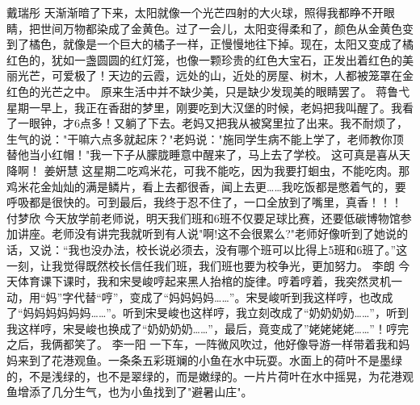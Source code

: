 {}\markdownRendererInterblockSeparator
{}戴瑞彤\markdownRendererInterblockSeparator
{}天渐渐暗了下来，太阳就像一个光芒四射的大火球，照得我都睁不开眼睛，把世间万物都染成了金黄色。过了一会儿，太阳变得柔和了，颜色从金黄色变到了橘色，就像是一个巨大的橘子一样，正慢慢地往下掉。现在，太阳又变成了橘红色的，犹如一盏圆圆的红灯笼，也像一颗珍贵的红色大宝石，正发出着红色的美丽光芒，可爱极了！天边的云霞，远处的山，近处的房屋、树木，人都被笼罩在金红色的光芒之中。\markdownRendererInterblockSeparator
{}原来生活中并不缺少美，只是缺少发现美的眼睛罢了。\markdownRendererInterblockSeparator
{}\markdownRendererInterblockSeparator
{}蒋鲁弋\markdownRendererInterblockSeparator
{}星期一早上，我正在香甜的梦里，刚要吃到大汉堡的时候，老妈把我叫醒了。我看了一眼钟，才6点多！又躺了下去。老妈又把我从被窝里拉了出来。我不耐烦了，生气的说："干嘛六点多就起床？"老妈说："施同学生病不能上学了，老师教你顶替他当小红帽！"我一下子从朦胧睡意中醒来了，马上去了学校。\markdownRendererInterblockSeparator
{}这可真是喜从天降啊！\markdownRendererInterblockSeparator
{}\markdownRendererInterblockSeparator
{}姜姸慧\markdownRendererInterblockSeparator
{}这星期二吃鸡米花，可我不能吃，因为我要打蛔虫，不能吃肉。那鸡米花金灿灿的满是鳞片，看上去都很香，闻上去更……我吃饭都是憋着气的，要呼吸都是很快的。可到最后，我终于忍不住了，一口全放到了嘴里，真香！！！\markdownRendererInterblockSeparator
{}\markdownRendererInterblockSeparator
{}付梦欣\markdownRendererInterblockSeparator
{}今天放学前老师说，明天我们班和6班不仅要足球比赛，还要低碳博物馆参加讲座。老师没有讲完我就听到有人说"啊!这不会很累么?"老师好像听到了她说的话，又说：“我也没办法，校长说必须去，没有哪个班可以比得上5班和6班了。”这一刻，让我觉得既然校长信任我们班，我们班也要为校争光，更加努力。\markdownRendererInterblockSeparator
{}\markdownRendererInterblockSeparator
{}李朗\markdownRendererInterblockSeparator
{}今天体育课下课时，我和宋旻峻哼起来黑人抬棺的旋律。哼着哼着，我突然灵机一动，用“妈”字代替“哼”，变成了“妈妈妈妈……”。宋旻峻听到我这样哼，也改成了“妈妈妈妈妈妈……”。听到宋旻峻也这样哼，我立刻改成了“奶奶奶奶……”，听到我这样哼，宋旻峻也换成了“奶奶奶奶……”，最后，竟变成了”姥姥姥姥……”！哼完之后，我俩都笑了。\markdownRendererInterblockSeparator
{}\markdownRendererInterblockSeparator
{}李一阳\markdownRendererInterblockSeparator
{}一下车，一阵微风吹过，他好像导游一样带着我和妈妈来到了花港观鱼。一条条五彩斑斓的小鱼在水中玩耍。水面上的荷叶不是墨绿的，不是浅绿的，也不是翠绿的，而是嫩绿的。一片片荷叶在水中摇晃，为花港观鱼增添了几分生气，也为小鱼找到了"避暑山庄"。\markdownRendererInterblockSeparator
